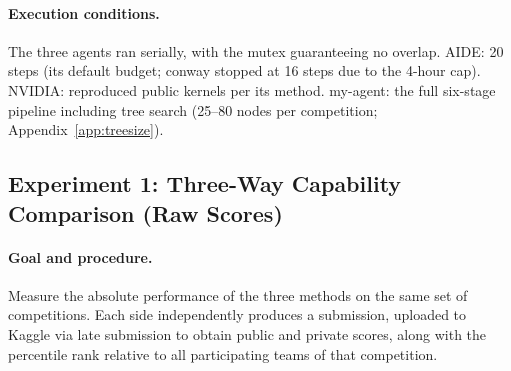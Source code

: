 \documentclass[11pt,a4paper]{article}
\begin{document}
\paragraph{Execution conditions.} The three agents ran serially, with the mutex guaranteeing no overlap. AIDE: 20 steps (its default budget; conway stopped at 16 steps due to the 4-hour cap). NVIDIA: reproduced public kernels per its method. my-agent: the full six-stage pipeline including tree search (25--80 nodes per competition; Appendix~\ref{app:treesize}).

\subsection{Experiment 1: Three-Way Capability Comparison (Raw Scores)}
\label{sec:exp1}

\paragraph{Goal and procedure.} Measure the absolute performance of the three methods on the same set of competitions. Each side independently produces a submission, uploaded to Kaggle via late submission to obtain public and private scores, along with the percentile rank relative to all participating teams of that competition.
\end{document}
